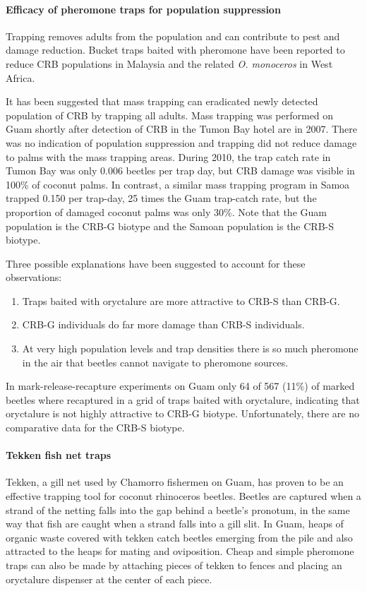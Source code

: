 \documentclass[twocolumn,letterpaper]{scrartcl}
\begin{document}
\paragraph{Efficacy of pheromone traps for population suppression} Trapping removes adults from the population and can contribute to pest and damage reduction. Bucket traps baited with pheromone have been reported to reduce CRB populations in Malaysia and the related \textit{O. monoceros} in West Africa. 

It has been suggested that mass trapping can eradicated newly detected population of CRB by trapping all adults. Mass trapping was performed on Guam shortly after detection of CRB in the Tumon Bay hotel are in 2007. There was no indication of population suppression and trapping did not reduce damage to palms with the mass trapping areas. During 2010, the trap catch rate in Tumon Bay was only 0.006 beetles per trap day, but CRB damage was visible in 100\% of coconut palms. In contrast, a similar mass trapping program in Samoa trapped 0.150 per trap-day, 25 times the Guam trap-catch rate, but the proportion of damaged coconut palms was only 30\%. Note that the Guam population is the CRB-G biotype and the Samoan population is the CRB-S biotype. 

Three possible explanations have been suggested to account for these observations:
\begin{enumerate}
\item Traps baited with oryctalure are more attractive to CRB-S than CRB-G.
\item CRB-G individuals do far more damage than CRB-S individuals.
\item At very high population levels and trap densities there is so much pheromone in the air that beetles cannot navigate to pheromone sources.
\end{enumerate}

In mark-release-recapture experiments on Guam only 64 of 567 (11\%) of marked beetles where recaptured in a grid of traps baited with oryctalure, indicating that oryctalure is not highly attractive to CRB-G biotype. Unfortunately, there are no comparative data for the CRB-S biotype.  

\paragraph{Tekken fish net traps} Tekken, a gill net used by Chamorro fishermen on Guam, has proven to be an effective trapping tool for coconut rhinoceros beetles. Beetles are captured when a strand of the netting falls into the gap behind a beetle's pronotum, in the same way that fish are caught when a strand falls into a gill slit. In Guam, heaps of organic waste covered with tekken catch beetles emerging from the pile and also attracted to the heaps for mating and oviposition. Cheap and simple pheromone traps can also be made by attaching pieces of tekken to fences and placing an oryctalure dispenser at the center of each piece. 
\end{document}
